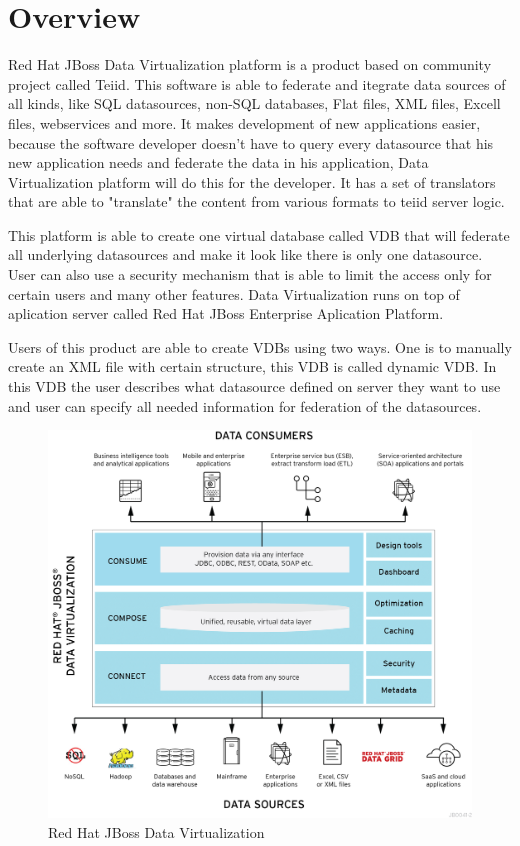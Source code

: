 \documentclass[12pt,oneside]{fithesis2}
\begin{document}
\section{Overview}
\par Red Hat JBoss Data Virtualization platform is a product based on community project called Teiid.  This software is able to federate and itegrate data sources of all kinds, like SQL datasources, non-SQL databases, Flat files, XML files, Excell files, webservices and more. It makes development of new applications easier, because the software developer doesn't have to query every datasource that his new application needs and federate the data in his application, Data Virtualization platform will do this for the developer. It has a set of translators that are able to "translate" the content from various formats to teiid server logic.
\par This platform is able to create one virtual database called VDB that will federate all underlying datasources and make it look like there is only one datasource. User can also use a security mechanism that is able to limit the access only for certain users and many other features. Data Virtualization runs on top of aplication server called Red Hat JBoss Enterprise Aplication Platform.
\par Users of this product are able to create VDBs using two ways. One is to manually create an XML file with certain structure, this VDB is called dynamic VDB. In this VDB the user describes what datasource defined on server they want to use and user can specify all needed information for federation of the datasources.
\begin{figure}[H]
\caption{Red Hat JBoss Data Virtualization}
\label{fig:dv}
\centering
\vspace{5mm}
\includegraphics[scale=0.15]{dv} 
\end{figure} 
\end{document}
